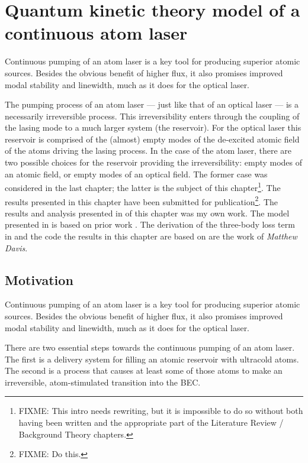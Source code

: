 \chapter{Quantum kinetic theory model of a continuous atom laser}
\label{KineticTheory}
\graphicspath{{Figures/KineticTheory/}{Figures/Common/}}

Continuous pumping of an atom laser is a key tool for producing superior atomic sources. Besides the obvious benefit of higher flux, it also promises improved modal stability and linewidth, much as it does for the optical laser.

The pumping process of an atom laser --- just like that of an optical laser --- is a necessarily irreversible process. This irreversibility enters through the coupling of the lasing mode to a much larger system (the reservoir). For the optical laser this reservoir is comprised of the (almost) empty modes of the de-excited atomic field of the atoms driving the lasing process. In the case of the atom laser, there are two possible choices for the reservoir providing the irreversibility: empty modes of an atomic field, or empty modes of an optical field. The former case was considered in the last chapter; the latter is the subject of this chapter\footnote{FIXME: This intro needs rewriting, but it is impossible to do so without both  having been written and the appropriate part of the Literature Review / Background Theory chapters.}. The results presented in this chapter have been submitted for publication\footnote{FIXME: Do this.}. The results and analysis presented in  of this chapter was my own work. The model presented in  is based on prior work \citep{Davis:2000vn,Bijlsma:2000}. The derivation of the three-body loss term in  and the code the results in this chapter are based on are the work of \emph{Matthew Davis}.

\section{Motivation}

Continuous pumping of an atom laser is a key tool for producing superior atomic sources. Besides the obvious benefit of higher flux, it also promises improved modal stability and linewidth, much as it does for the optical laser.

There are two essential steps towards the continuous pumping of an atom laser. The first is a delivery system for filling an atomic reservoir with ultracold atoms. The second is a process that causes at least some of those atoms to make an irreversible, atom-stimulated transition into the BEC.

